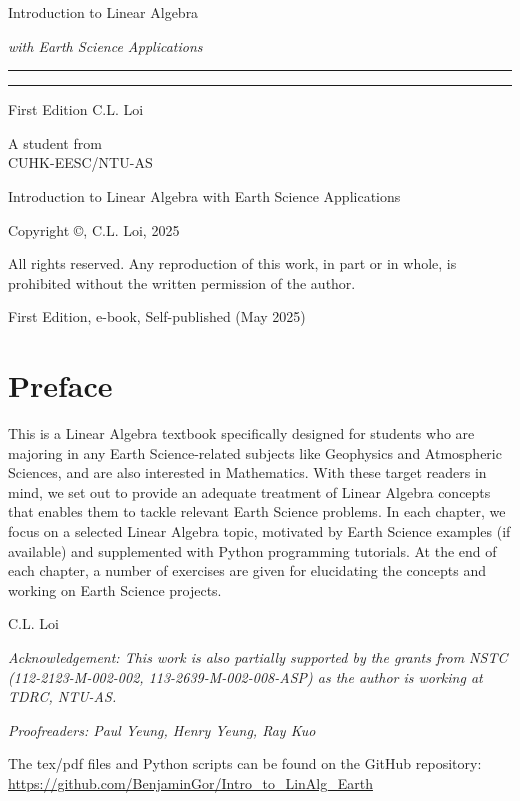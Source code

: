 \begin{titlepage}
    {\Huge\raggedright Introduction to Linear Algebra \par}
    {\Large\raggedright \textit{with Earth Science Applications} \hfill\textcolor{Mahogany}{\rule{3mm}{3mm}} \par}
    \vspace{3mm}\hrule\par
    {\Large\raggedleft First Edition \hfill C.L. Loi \par}
    \vfill
    {\Large\raggedleft A student from\\
    CUHK-EESC/NTU-AS \par}
\end{titlepage}

\begin{titlepage}
\begin{center}
Introduction to Linear Algebra with Earth Science Applications

Copyright ©, C.L. Loi, 2025

All rights reserved. Any reproduction of this work, in part or in whole, is prohibited without the written permission of the author.
\end{center}
\vfill
First Edition, e-book, Self-published (May 2025)
\end{titlepage}


\chapter*{Preface}
This is a Linear Algebra textbook specifically designed for students who are majoring in any Earth Science-related subjects like Geophysics and Atmospheric Sciences, and are also interested in Mathematics. With these target readers in mind, we set out to provide an adequate treatment of Linear Algebra concepts that enables them to tackle relevant Earth Science problems. In each chapter, we focus on a selected Linear Algebra topic, motivated by Earth Science examples (if available) and supplemented with Python programming tutorials. At the end of each chapter, a number of exercises are given for elucidating the concepts and working on Earth Science projects. \par
{\raggedleft C.L. Loi \par}
\textit{Acknowledgement: This work is also partially supported by the grants from NSTC (112-2123-M-002-002, 113-2639-M-002-008-ASP) as the author is working at TDRC, NTU-AS.}\par
\textit{Proofreaders: Paul Yeung, Henry Yeung, Ray Kuo}\par
The tex/pdf files and Python scripts can be found on the GitHub repository:\\ \href{https://github.com/BenjaminGor/Intro_to_LinAlg_Earth}{https://github.com/BenjaminGor/Intro\_to\_LinAlg\_Earth}

